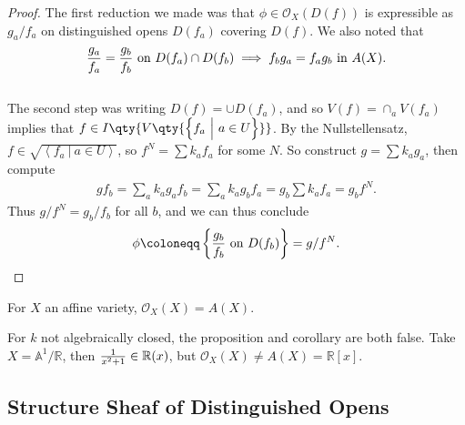 \begin{proof}

The first reduction we made was that \(\phi \in {\mathcal{O}}_X(D(f))\)
is expressible as \(g_a / f_a\) on distinguished opens \(D(f_a)\)
covering \(D(f)\). We also noted that
\begin{align*}
{g_a \over f_a} = {g_b \over f_b} \text{ on } D(f_a) \cap D(f_b) \implies f_b g_a = f_a g_b \text{ in } A(X)
.\end{align*}
\\

The second step was writing \(D(f) = \cup D(f_a)\), and so
\(V(f) = \cap_a V(f_a)\) implies that
\(f\in I\qty{ V\qty{ \left\{{f_a {~\mathrel{\Big|}~}a\in U}\right\} }}\).
By the Nullstellensatz,
\(f\in \sqrt{\left\langle{f_a {~\mathrel{\Big|}~}a\in U}\right\rangle}\),
so \(f^N = \sum k_a f_a\) for some \(N\). So construct
\(g = \sum k_a g_a\), then compute
\begin{align*}  
gf_b = \sum_a k_a g_a f_b = \sum_a k_a g_b f_a = g_b \sum k_a f_a = g_b f^N
.\end{align*}
Thus \(g/f^N = g_b / f_b\) for all \(b\), and we can thus conclude
\begin{align*}  
\phi \coloneqq\left\{{{g_b \over f_b} \text{ on } D(f_b)}\right\} = g/f^N
.\end{align*}

\end{proof}

\begin{corollary}[?]

For \(X\) an affine variety, \({\mathcal{O}}_X(X) = A(X)\).

\end{corollary}

\begin{warnings}

For \(k\) not algebraically closed, the proposition and corollary are
both false. Take \(X = {\mathbb{A}}^1/{\mathbb{R}}\), then
\({1\over x^2+1} \in {\mathbb{R}}(x)\), but
\({\mathcal{O}}_X(X) \neq A(X) = {\mathbb{R}}[x]\).

\end{warnings}

\hypertarget{structure-sheaf-of-distinguished-opens}{%
\subsection{Structure Sheaf of Distinguished
Opens}\label{structure-sheaf-of-distinguished-opens}}

